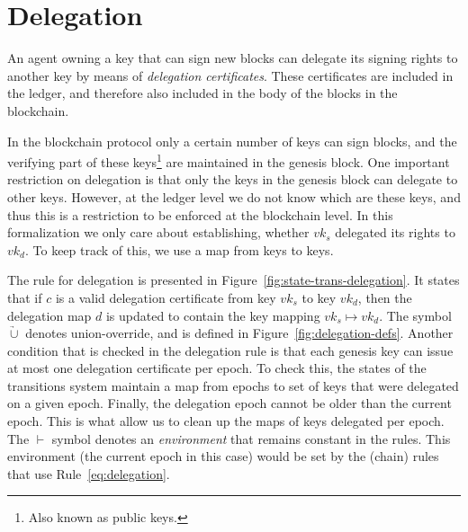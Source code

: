 \documentclass[11pt,a4paper]{article}
\newcommand{\unionoverride}{\mathbin{\underrightarrow\cup}}
\newcommand{\var}[1]{\mathit{#1}}
\begin{document}
\section{Delegation}
\label{sec:delegation}

An agent owning a key that can sign new blocks can delegate its signing rights
to another key by means of \textit{delegation certificates}. These certificates
are included in the ledger, and therefore also included in the body of the
blocks in the blockchain.

In the blockchain protocol only a certain number of keys can sign blocks, and
the verifying part of these keys\footnote{Also known as public keys.} are
maintained in the genesis block. One important restriction on delegation is
that only the keys in the genesis block can delegate to other keys. However, at
the ledger level we do not know which are these keys, and thus this is a
restriction to be enforced at the blockchain level. In this formalization we
only care about establishing, whether $\var{vk}_s$ delegated its rights to
$\var{vk}_d$. To keep track of this, we use a map from keys to keys.

The rule for delegation is presented in
Figure~\ref{fig:state-trans-delegation}. It states that if $\var{c}$ is a valid
delegation certificate from key $\var{vk}_s$ to key $\var{vk}_d$, then the
delegation map $d$ is updated to contain the key mapping
$\var{vk}_s \mapsto \var{vk}_d$. The symbol $\unionoverride$ denotes
union-override, and is defined in Figure~\ref{fig:delegation-defs}. Another
condition that is checked in the delegation rule is that each genesis key can
issue at most one delegation certificate per epoch. To check this, the states
of the transitions system maintain a map from epochs to set of keys that were
delegated on a given epoch. Finally, the delegation epoch cannot be older than
the current epoch. This is what allow us to clean up the maps of keys delegated
per epoch. The $\vdash$ symbol denotes an \textit{environment} that remains
constant in the rules. This environment (the current epoch in this case) would
be set by the (chain) rules that use Rule~\ref{eq:delegation}.
\end{document}
